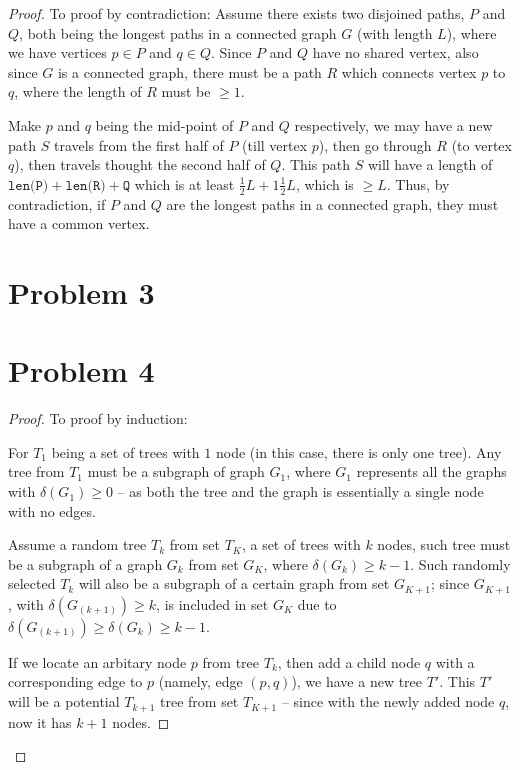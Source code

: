 \documentclass[12pt]{article}
\newcommand{\ilc}{\texttt}
\begin{document}
\begin{proof}
To proof by contradiction:\newline
Assume there exists two disjoined paths, $P$ and $Q$, both being the longest paths in a connected graph $G$ (with length $L$), where we have vertices $p \in P$ and $q \in Q$. Since $P$ and $Q$ have no shared vertex, also since $G$ is a connected graph, there must be a path $R$ which connects vertex $p$ to $q$, where the length of $R$ must be $\geq 1$.

Make $p$ and $q$ being the mid-point of $P$ and $Q$ respectively, we may have a new path $S$ travels from the first half of $P$ (till vertex $p$), then go through $R$ (to vertex $q$), then travels thought the second half of $Q$. This path $S$ will have a length of $\ilc{len(P)} + \ilc{len(R)} + \ilc{Q}$ which is at least $\frac{1}{2}L + 1 \frac{1}{2}L$, which is $\geq L$. Thus, by contradiction, if $P$ and $Q$ are the longest paths in a connected graph, they must have a common vertex.


\section{Problem 3}



\section{Problem 4}


\begin{proof}
To proof by induction: \newline

For $T_1$ being a set of trees with $1$ node (in this case, there is only one tree). Any tree from $T_1$ must be a subgraph of graph $G_1$, where $G_1$ represents all the graphs with $\delta(G_1) \geq 0$ -- as both the tree and the graph is essentially a single node with no edges. \newline

Assume a random tree $T_k$ from set $T_K$, a set of trees with $k$ nodes, such tree must be a subgraph of a graph $G_k$ from set $G_K$, where $\delta(G_k) \geq k - 1$. Such randomly selected $T_k$ will also be a subgraph of a certain graph from set $G_{K+1}$; since $G_{K+1}$, with $\delta(G_(k+1)) \geq k$, is included in set $G_K$ due to $\delta(G_(k+1)) \geq \delta(G_k) \geq k - 1$.\newline

If we locate an arbitary node $p$ from tree $T_{k}$, then add a child node $q$ with a corresponding edge to $p$  (namely, edge $(p, q)$), we have a new tree $T'$. This $T'$ will be a potential $T_{k+1}$ tree from set $T_{K+1}$ -- since with the newly added node $q$, now it has $k+1$ nodes.


\end{proof}
\end{proof}
\end{document}
